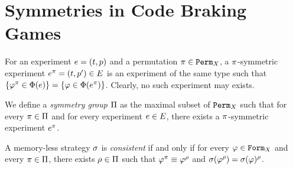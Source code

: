 \section{Symmetries in Code Braking Games}



\begin{definition}
For an experiment $e = (t, p)$ and a permutation $\pi\in\mathtt{Perm}_X$,
  a $\pi$-symmetric experiment $e^\pi = (t, p')\in E$
  is an experiment of the same type such that
  $\{\varphi^\pi \in\Phi(e)\} = \{\varphi\in\Phi(e^\pi)\}$.
Clearly, no such experiment may exists.
\end{definition}

\begin{definition}
We define a \emph{symmetry group} $\Pi$ as
  the maximal subset of $\mathtt{Perm}_X$ such that for
  every $\pi\in\Pi$ and for every experiment $e\in E$,
  there exists a $\pi$-symmetric experiment $e^\pi$.
\end{definition}

\begin{definition}
A memory-less strategy $\sigma$ is \emph{consistent} if and only if
  for every $\varphi\in\mathtt{Form}_X$ and every $\pi\in\Pi$, there
  exists $\rho\in\Pi$ such that $\varphi^\pi \equiv \varphi^\rho$ and
  $\sigma(\varphi^\rho) = \sigma(\varphi)^\rho$.
\end{definition}


